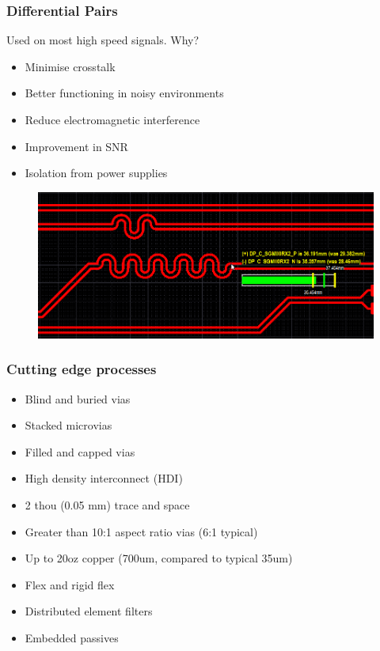 \documentclass[t]{beamer}
\begin{document}
\begin{frame}
\frametitle{Differential Pairs}
Used on most high speed signals. Why?\\
\begin{itemize}
	\item Minimise crosstalk
	\item Better functioning in noisy environments
	\item Reduce electromagnetic interference 
	\item Improvement in SNR
	\item Isolation from power supplies
\end{itemize}
\begin{figure}
	\includegraphics[width=0.9\linewidth]{DiffPair_LengthTuning.png}
\end{figure}

\end{frame}
\begin{frame}
	\frametitle{Cutting edge processes}
	\begin{itemize}
		\item Blind and buried vias 
		\item Stacked microvias
		\item Filled and capped vias
		\item High density interconnect (HDI)
		\item 2 thou (0.05 mm) trace and space
		\item Greater than 10:1 aspect ratio vias (6:1 typical)
		\item Up to 20oz copper (700um, compared to typical 35um)
		\item Flex and rigid flex
		\item Distributed element filters
		\item Embedded passives
	\end{itemize}
\end{frame}
\end{document}
